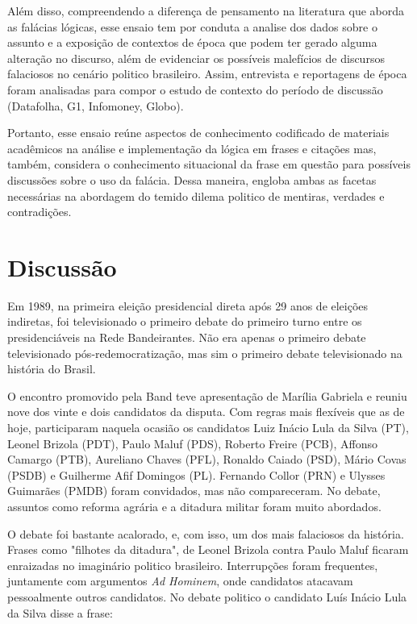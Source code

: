 \documentclass[12pt]{article}
\begin{document}
Além disso, compreendendo a diferença de pensamento na literatura que aborda as falácias lógicas, esse ensaio tem por conduta a analise dos dados sobre o assunto e a exposição de contextos de época que podem ter gerado alguma alteração no discurso, além de evidenciar os possíveis malefícios de discursos falaciosos no cenário politico brasileiro. Assim, entrevista e reportagens de época foram analisadas para compor o estudo de contexto do período de discussão (Datafolha, G1, Infomoney, Globo).

Portanto, esse ensaio reúne aspectos de conhecimento codificado de materiais acadêmicos na análise e implementação da lógica em frases e citações mas, também, considera o conhecimento situacional da frase em questão para possíveis discussões sobre o uso da falácia. Dessa maneira, engloba ambas as facetas necessárias na abordagem do temido dilema politico de mentiras, verdades e contradições.

\section{Discussão}

Em 1989, na primeira eleição presidencial direta após 29 anos de eleições indiretas, foi televisionado o primeiro debate do primeiro turno entre os presidenciáveis na Rede Bandeirantes. Não era apenas o primeiro debate televisionado pós-redemocratização, mas sim o primeiro debate televisionado na história do Brasil.  \cite{Band-5} 

O encontro promovido pela Band teve apresentação de Marília Gabriela e reuniu nove dos vinte e dois candidatos da disputa. Com regras mais flexíveis que as de hoje, participaram naquela ocasião os candidatos Luiz Inácio Lula da Silva (PT), Leonel Brizola (PDT), Paulo Maluf (PDS), Roberto Freire (PCB), Affonso Camargo (PTB), Aureliano Chaves (PFL), Ronaldo Caiado (PSD), Mário Covas (PSDB) e Guilherme Afif Domingos (PL). Fernando Collor (PRN) e Ulysses Guimarães (PMDB) foram convidados, mas não compareceram. No debate, assuntos como reforma agrária e a ditadura militar foram muito abordados. 

O debate foi bastante acalorado, e, com isso, um dos mais falaciosos da história. Frases como "filhotes da ditadura", de Leonel Brizola contra Paulo Maluf ficaram enraizadas no imaginário politico brasileiro. \cite{Maluf-6} Interrupções foram frequentes, juntamente com argumentos \textit{Ad Hominem}, onde candidatos atacavam pessoalmente outros candidatos. No debate politico o candidato Luís Inácio Lula da Silva disse a frase: 
\end{document}
